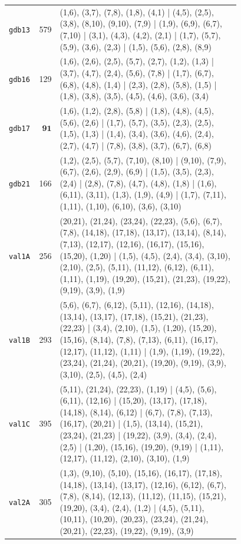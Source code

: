 \begin{landscape}
\begin{longtable}{lr>{\tiny\raggedright\arraybackslash}p{0.78\linewidth}}
\texttt{gdb13} & 579 & (1,6), (3,7), (7,8), (1,8), (4,1) | (4,5), (2,5), (3,8), (8,10), (9,10), (7,9) | (1,9), (6,9), (6,7), (7,10) | (3,1), (4,3), (4,2), (2,1) | (1,7), (5,7), (5,9), (3,6), (2,3) | (1,5), (5,6), (2,8), (8,9) \\[2pt]
\texttt{gdb16} & 129 & (1,6), (2,6), (2,5), (5,7), (2,7), (1,2), (1,3) | (3,7), (4,7), (2,4), (5,6), (7,8) | (1,7), (6,7), (6,8), (4,8), (1,4) | (2,3), (2,8), (5,8), (1,5) | (1,8), (3,8), (3,5), (4,5), (4,6), (3,6), (3,4) \\[2pt]
\texttt{gdb17} & $\mathbf{91}$ & (1,6), (1,2), (2,8), (5,8) | (1,8), (4,8), (4,5), (5,6), (2,6) | (1,7), (5,7), (3,5), (2,3), (2,5), (1,5), (1,3) | (1,4), (3,4), (3,6), (4,6), (2,4), (2,7), (4,7) | (7,8), (3,8), (3,7), (6,7), (6,8) \\[2pt]
\texttt{gdb21} & 166 & (1,2), (2,5), (5,7), (7,10), (8,10) | (9,10), (7,9), (6,7), (2,6), (2,9), (6,9) | (1,5), (3,5), (2,3), (2,4) | (2,8), (7,8), (4,7), (4,8), (1,8) | (1,6), (6,11), (3,11), (1,3), (1,9), (4,9) | (1,7), (7,11), (1,11), (1,10), (6,10), (3,6), (3,10) \\[2pt]
\texttt{val1A} & 256 & (20,21), (21,24), (23,24), (22,23), (5,6), (6,7), (7,8), (14,18), (17,18), (13,17), (13,14), (8,14), (7,13), (12,17), (12,16), (16,17), (15,16), (15,20), (1,20) | (1,5), (4,5), (2,4), (3,4), (3,10), (2,10), (2,5), (5,11), (11,12), (6,12), (6,11), (1,11), (1,19), (19,20), (15,21), (21,23), (19,22), (9,19), (3,9), (1,9) \\[2pt]
\texttt{val1B} & 293 & (5,6), (6,7), (6,12), (5,11), (12,16), (14,18), (13,14), (13,17), (17,18), (15,21), (21,23), (22,23) | (3,4), (2,10), (1,5), (1,20), (15,20), (15,16), (8,14), (7,8), (7,13), (6,11), (16,17), (12,17), (11,12), (1,11) | (1,9), (1,19), (19,22), (23,24), (21,24), (20,21), (19,20), (9,19), (3,9), (3,10), (2,5), (4,5), (2,4) \\[2pt]
\texttt{val1C} & 395 & (5,11), (21,24), (22,23), (1,19) | (4,5), (5,6), (6,11), (12,16) | (15,20), (13,17), (17,18), (14,18), (8,14), (6,12) | (6,7), (7,8), (7,13), (16,17), (20,21) | (1,5), (13,14), (15,21), (23,24), (21,23) | (19,22), (3,9), (3,4), (2,4), (2,5) | (1,20), (15,16), (19,20), (9,19) | (1,11), (12,17), (11,12), (2,10), (3,10), (1,9) \\[2pt]
\texttt{val2A} & 305 & (1,3), (9,10), (5,10), (15,16), (16,17), (17,18), (14,18), (13,14), (13,17), (12,16), (6,12), (6,7), (7,8), (8,14), (12,13), (11,12), (11,15), (15,21), (19,20), (3,4), (2,4), (1,2) | (4,5), (5,11), (10,11), (10,20), (20,23), (23,24), (21,24), (20,21), (22,23), (19,22), (9,19), (3,9) \\[2pt]

\end{longtable}
\end{landscape}
